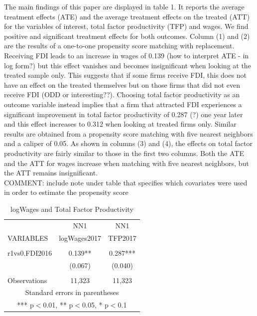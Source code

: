 \documentclass[a4paper,11pt]{scrartcl}
\begin{document}
The main findings of this paper are displayed in table 1. It reports the average treatment effects (ATE) and the average treatment effects on the treated (ATT) for the variables of interest, total factor productivity (TFP) and wages. We find positive and significant treatment effects for both outcomes. Column (1) and (2) are the results of a one-to-one propensity score matching with replacement. Receiving FDI leads to an increase in wages of 0.139 (how to interpret ATE - in log form?) but this effect vanishes and becomes insignificant when looking at the treated sample only. This suggests that if some firms receive FDI, this does not have an effect on the treated themselves but on those firms that did not even receive FDI (ODD or interesting??).  Choosing total factor productivity as an outcome variable instead implies that a firm that attracted FDI experiences a significant improvement in total factor productivity of 0.287 (?) one year later and this effect increases to 0.312 when looking at treated firms only. Similar results are obtained from a propensity score matching with five nearest neighbors and a caliper of 0.05. As shown in columns (3) and (4), the effects on total factor productivity are fairly similar to those in the first two columns. Both the ATE and the ATT for wages increase when matching with five nearest neighbors, but the ATT remains insignificant. \\

COMMENT: include note under table that specifies which covariates were used in order to estimate the propensity score

\begin{table}[htbp]\centering
\caption{logWages and Total Factor Productivity}
\begin{tabular}{lcc} \hline
 &NN1 & NN1\\
VARIABLES & logWages2017 & TFP2017 \\ \hline
 &  &  \\
r1vs0.FDI2016 & 0.139** & 0.287*** \\
 & (0.067) & (0.040) \\
 &  &  \\
 Observations & 11,323 & 11,323 \\ \hline
\multicolumn{3}{c}{ Standard errors in parentheses} \\
\multicolumn{3}{c}{ *** p$<$0.01, ** p$<$0.05, * p$<$0.1} \\
\end{tabular}
\end{table}
\end{document}
